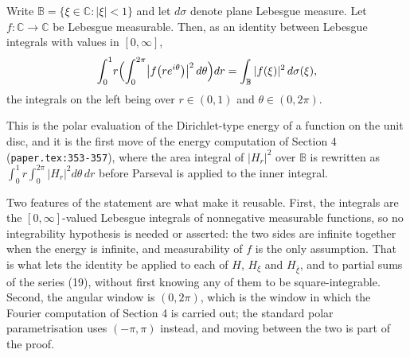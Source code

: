 \begin{helper}
Write $\mathbb{B}=\{\xi\in\mathbb{C}:|\xi|<1\}$ and let $d\sigma$ denote plane
Lebesgue measure.  Let $f\colon\mathbb{C}\to\mathbb{C}$ be Lebesgue
measurable.  Then, as an identity between Lebesgue integrals with values in
$[0,\infty]$,
\[
  \int_{0}^{1}\!r\Bigl(\int_{0}^{2\pi}
      \bigl|f\bigl(re^{i\theta}\bigr)\bigr|^{2}\,d\theta\Bigr)dr
  =\int_{\mathbb{B}}|f(\xi)|^{2}\,d\sigma(\xi),
\]
the integrals on the left being over $r\in(0,1)$ and $\theta\in(0,2\pi)$.

This is the polar evaluation of the Dirichlet-type energy of a function on the
unit disc, and it is the first move of the energy computation of Section 4
(\texttt{paper.tex:353-357}), where the area integral of $|H_r|^{2}$ over
$\mathbb{B}$ is rewritten as $\int_0^1r\int_0^{2\pi}|H_r|^{2}d\theta\,dr$
before Parseval is applied to the inner integral.

Two features of the statement are what make it reusable.  First, the integrals
are the $[0,\infty]$-valued Lebesgue integrals of nonnegative measurable
functions, so no integrability hypothesis is needed or asserted: the two sides
are infinite together when the energy is infinite, and measurability of $f$ is
the only assumption.  That is what lets the identity be applied to each of
$H$, $H_\xi$ and $H_{\bar\xi}$, and to partial sums of the series (19),
without first knowing any of them to be square-integrable.  Second, the
angular window is $(0,2\pi)$, which is the window in which the Fourier
computation of Section 4 is carried out; the standard polar parametrisation
uses $(-\pi,\pi)$ instead, and moving between the two is part of the proof.
\end{helper}
